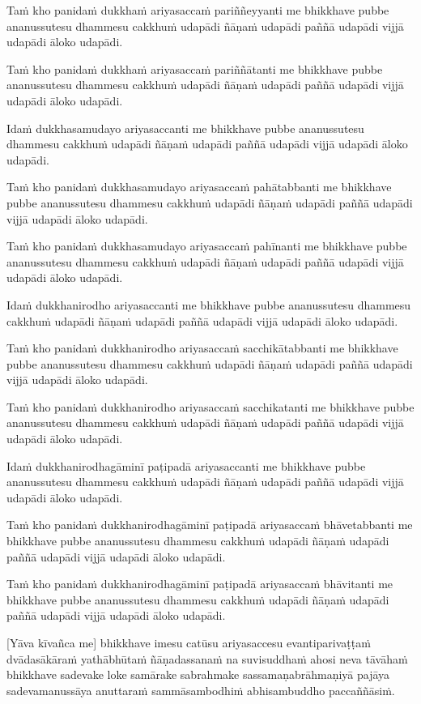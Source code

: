 Taṁ kho panidaṁ dukkhaṁ ariyasaccaṁ pariññeyyanti me bhikkhave pubbe ananussutesu dhammesu cakkhuṁ udapādi ñāṇaṁ udapādi paññā udapādi vijjā udapādi āloko udapādi.

Taṁ kho panidaṁ dukkhaṁ ariyasaccaṁ pariññātanti me bhikkhave pubbe ananussutesu dhammesu cakkhuṁ udapādi ñāṇaṁ udapādi paññā udapādi vijjā udapādi āloko udapādi.

Idaṁ dukkhasamudayo ariyasaccanti me bhikkhave pubbe ananussutesu dhammesu cakkhuṁ udapādi ñāṇaṁ udapādi paññā udapādi vijjā udapādi āloko udapādi.

Taṁ kho panidaṁ dukkhasamudayo ariyasaccaṁ pahātabbanti me bhikkhave pubbe ananussutesu dhammesu cakkhuṁ udapādi ñāṇaṁ udapādi paññā udapādi vijjā udapādi āloko udapādi.

Taṁ kho panidaṁ dukkhasamudayo ariyasaccaṁ pahīnanti me bhikkhave pubbe ananussutesu dhammesu cakkhuṁ udapādi ñāṇaṁ udapādi paññā udapādi vijjā udapādi āloko udapādi.

Idaṁ dukkhanirodho ariyasaccanti me bhikkhave pubbe ananussutesu dhammesu cakkhuṁ udapādi ñāṇaṁ udapādi paññā udapādi vijjā udapādi āloko udapādi.

Taṁ kho panidaṁ dukkhanirodho ariyasaccaṁ sacchikātabbanti me bhikkhave pubbe ananussutesu dhammesu cakkhuṁ udapādi ñāṇaṁ udapādi paññā udapādi vijjā udapādi āloko udapādi.

Taṁ kho panidaṁ dukkhanirodho ariyasaccaṁ sacchikatanti me bhikkhave pubbe ananussutesu dhammesu cakkhuṁ udapādi ñāṇaṁ udapādi paññā udapādi vijjā udapādi āloko udapādi.

Idaṁ dukkhanirodhagāminī paṭipadā ariyasaccanti me bhikkhave pubbe ananussutesu dhammesu cakkhuṁ udapādi ñāṇaṁ udapādi paññā udapādi vijjā udapādi āloko udapādi.

Taṁ kho panidaṁ dukkhanirodhagāminī paṭipadā ariyasaccaṁ bhāvetabbanti me bhikkhave pubbe ananussutesu dhammesu cakkhuṁ udapādi ñāṇaṁ udapādi paññā udapādi vijjā udapādi āloko udapādi.

Taṁ kho panidaṁ dukkhanirodhagāminī paṭipadā ariyasaccaṁ bhāvitanti me bhikkhave pubbe ananussutesu dhammesu cakkhuṁ udapādi ñāṇaṁ udapādi paññā udapādi vijjā udapādi āloko udapādi.

[Yāva kīvañca me] bhikkhave imesu catūsu ariyasaccesu evantiparivaṭṭaṁ dvādasākāraṁ yathābhūtaṁ ñāṇadassanaṁ na suvisuddhaṁ ahosi neva tāvāhaṁ bhikkhave sadevake loke samārake sabrahmake sassamaṇabrāhmaṇiyā pajāya sadevamanussāya anuttaraṁ sammāsambodhiṁ abhisambuddho paccaññāsiṁ.

